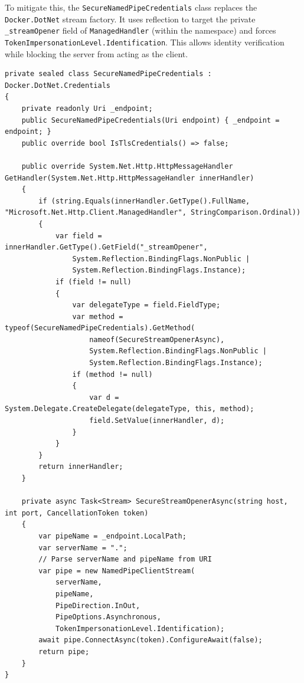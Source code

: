 To mitigate this, the \texttt{Secure\-Named\-Pipe\-Credentials} class replaces the \texttt{Docker.\-Dot\-Net} stream factory. It uses reflection to target the private \texttt{\_stream\-Opener} field of \texttt{Managed\-Handler} (within the  namespace) and forces \texttt{Token\-Impersonation\-Level.}\allowbreak\texttt{Identification}. This allows identity verification while blocking the server from acting as the client.

\begin{lstlisting}[language=CSharp, caption={Windows Named Pipe Impersonation Override}, label={lst:namedpipe}]
private sealed class SecureNamedPipeCredentials : Docker.DotNet.Credentials
{
    private readonly Uri _endpoint;
    public SecureNamedPipeCredentials(Uri endpoint) { _endpoint = endpoint; }
    public override bool IsTlsCredentials() => false;

    public override System.Net.Http.HttpMessageHandler GetHandler(System.Net.Http.HttpMessageHandler innerHandler)
    {
        if (string.Equals(innerHandler.GetType().FullName, "Microsoft.Net.Http.Client.ManagedHandler", StringComparison.Ordinal))
        {
            var field = innerHandler.GetType().GetField("_streamOpener", 
                System.Reflection.BindingFlags.NonPublic | 
                System.Reflection.BindingFlags.Instance);
            if (field != null)
            {
                var delegateType = field.FieldType;
                var method = typeof(SecureNamedPipeCredentials).GetMethod(
                    nameof(SecureStreamOpenerAsync), 
                    System.Reflection.BindingFlags.NonPublic | 
                    System.Reflection.BindingFlags.Instance);
                if (method != null)
                {
                    var d = System.Delegate.CreateDelegate(delegateType, this, method);
                    field.SetValue(innerHandler, d);
                }
            }
        }
        return innerHandler;
    }

    private async Task<Stream> SecureStreamOpenerAsync(string host, int port, CancellationToken token)
    {
        var pipeName = _endpoint.LocalPath;
        var serverName = ".";
        // Parse serverName and pipeName from URI
        var pipe = new NamedPipeClientStream(
            serverName,
            pipeName,
            PipeDirection.InOut,
            PipeOptions.Asynchronous,
            TokenImpersonationLevel.Identification);
        await pipe.ConnectAsync(token).ConfigureAwait(false);
        return pipe;
    }
}
\end{lstlisting}

